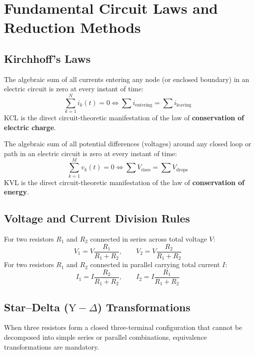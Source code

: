 \section{Fundamental Circuit Laws and Reduction Methods}

\subsection{Kirchhoff's Laws}
\begin{theorem}
The algebraic sum of all currents entering any node (or enclosed boundary) in an electric circuit is zero at every instant of time:
\begin{equation}
\sum_{k=1}^N i_k(t) = 0 \iff \sum i_{\text{entering}} = \sum i_{\text{leaving}}
\end{equation}
KCL is the direct circuit-theoretic manifestation of the law of \textbf{conservation of electric charge}.
\end{theorem}

\begin{theorem}
The algebraic sum of all potential differences (voltages) around any closed loop or path in an electric circuit is zero at every instant of time:
\begin{equation}
\sum_{k=1}^M v_k(t) = 0 \iff \sum V_{\text{rises}} = \sum V_{\text{drops}}
\end{equation}
KVL is the direct circuit-theoretic manifestation of the law of \textbf{conservation of energy}.
\end{theorem}

\subsection{Voltage and Current Division Rules}
For two resistors $R_1$ and $R_2$ connected in series across total voltage $V$:
\begin{equation}
V_1 = V \frac{R_1}{R_1 + R_2}, \qquad V_2 = V \frac{R_2}{R_1 + R_2}
\end{equation}
For two resistors $R_1$ and $R_2$ connected in parallel carrying total current $I$:
\begin{equation}
I_1 = I \frac{R_2}{R_1 + R_2}, \qquad I_2 = I \frac{R_1}{R_1 + R_2}
\end{equation}

\subsection{Star--Delta ($\text{Y}-\Delta$) Transformations}
When three resistors form a closed three-terminal configuration that cannot be decomposed into simple series or parallel combinations, equivalence transformations are mandatory.

